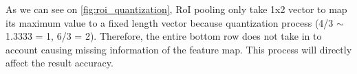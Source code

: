 	As we can see on \ref{fig:roi_quantization}, RoI pooling only take 1x2 vector to map its maximum value to a fixed length vector because quantization process (4/3 $\sim$ 1.3333 = 1, 6/3 = 2). Therefore, the entire bottom row does not take in to account causing missing information of the feature map. This process will directly affect the result accuracy.
	
	
	
	
	
	
	
	
	
	
	
	
	